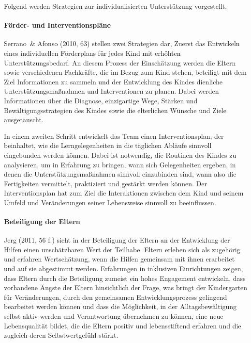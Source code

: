 Folgend werden Strategien zur individualisierten Unterstützung vorgestellt.
 
\paragraph{Förder- und Interventionspläne} 
Serrano~\& Afonso (2010, 63) stellen zwei Strategien dar, Zuerst das Entwickeln eines individuellen Förderplans für jedes Kind mit erhöhten Unterstützungsbedarf. An diesem Prozess der Einschätzung werden die Eltern sowie verschiedenen Fachkräfte, die im Bezug zum Kind stehen, beteiligt mit dem Ziel Informationen zu sammeln und der Entwicklung des Kindes dienliche Unterstützungsmaßnahmen und Interventionen zu planen. Dabei werden Informationen über die Diagnose, einzigartige Wege, Stärken und Bewältigungsstrategien des Kindes sowie die elterlichen Wünsche und Ziele ausgetauscht. 

In einem zweiten Schritt entwickelt das Team einen Interventionsplan, der beinhaltet, wie die Lerngelegenheiten in die täglichen Abläufe sinnvoll eingebunden werden können. Dabei ist notwendig, die Routinen des Kindes zu analysieren, um in Erfahrung zu bringen, wann sich Gelegenheiten ergeben, in denen die Unterstützungsmaßnahmen sinnvoll einzubinden sind, wann also die Fertigkeiten vermittelt, praktiziert und gestärkt werden können. Der Interventionsplan hat zum Ziel die Interaktionen zwischen dem Kind und seinem Umfeld und Veränderungen seiner Lebensweise sinnvoll zu beeinflussen.  

\paragraph{Beteiligung der Eltern} Jerg (2011, 56 f.) sieht in der Beteiligung der Eltern an der Entwicklung der Hilfen einen unschätzbaren Wert der Teilhabe. Eltern erleben sich als zugehörig und erfahren Wertschätzung, wenn die Hilfen gemeinsam mit ihnen erarbeitet und auf sie abgestimmt werden. Erfahrungen in inklusiven Einrichtungen zeigen, dass Eltern durch die Beteiligung zumeist ein hohes Engagement entwickeln, dass vorhandene Ängste der Eltern hinsichtlich der Frage, was bringt der Kindergarten für Veränderungen, durch den gemeinsamen Entwicklungsprozess gelingend bearbeitet werden können und dass die Möglichkeit, in der Alltagsbewältigung selbst aktiv werden und Verantwortung übernehmen zu können, eine neue Lebensqualität bildet, die die Eltern positiv und lebensstiftend erfahren und die zugleich deren Selbstwertgefühl stärkt.     

